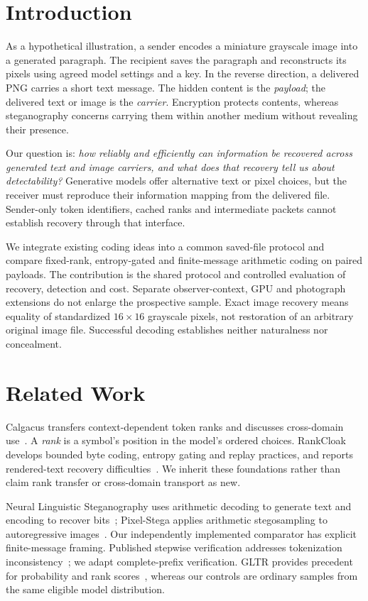 \documentclass[orivec]{llncs}
\begin{document}
\section{Introduction}
As a hypothetical illustration, a sender encodes a miniature grayscale image into a generated paragraph. The recipient saves the paragraph and reconstructs its pixels using agreed model settings and a key. In the reverse direction, a delivered PNG carries a short text message. The hidden content is the \emph{payload}; the delivered text or image is the \emph{carrier}. Encryption protects contents, whereas steganography concerns carrying them within another medium without revealing their presence.

Our question is: \emph{how reliably and efficiently can information be recovered across generated text and image carriers, and what does that recovery tell us about detectability?} Generative models offer alternative text or pixel choices, but the receiver must reproduce their information mapping from the delivered file. Sender-only token identifiers, cached ranks and intermediate packets cannot establish recovery through that interface.

We integrate existing coding ideas into a common saved-file protocol and compare fixed-rank, entropy-gated and finite-message arithmetic coding on paired payloads. The contribution is the shared protocol and controlled evaluation of recovery, detection and cost. Separate observer-context, GPU and photograph extensions do not enlarge the prospective sample. Exact image recovery means equality of standardized $16\times16$ grayscale pixels, not restoration of an arbitrary original image file. Successful decoding establishes neither naturalness nor concealment.

\section{Related Work}
Calgacus transfers context-dependent token ranks and discusses cross-domain use~\cite{calgacus}. A \emph{rank} is a symbol's position in the model's ordered choices. RankCloak develops bounded byte coding, entropy gating and replay practices, and reports rendered-text recovery difficulties~\cite{rankcloak}. We inherit these foundations rather than claim rank transfer or cross-domain transport as new.

Neural Linguistic Steganography uses arithmetic decoding to generate text and encoding to recover bits~\cite{ziegler}; Pixel-Stega applies arithmetic stegosampling to autoregressive images~\cite{pixelstega}. Our independently implemented comparator has explicit finite-message framing. Published stepwise verification addresses tokenization inconsistency~\cite{consistency}; we adapt complete-prefix verification. GLTR provides precedent for probability and rank scores~\cite{gltr}, whereas our controls are ordinary samples from the same eligible model distribution.
\end{document}
